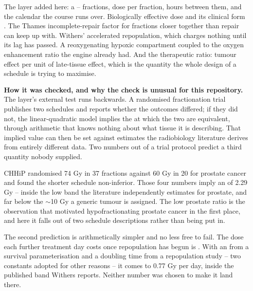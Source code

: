 \documentclass[11pt,twoside,openright]{report}
\begin{document}
\begin{numbers}
The layer added here: a  -- fractions, dose per fraction, hours between them, and the calendar the course runs over. Biologically effective dose  and its clinical form . The Thames incomplete-repair factor for fractions closer together than repair can keep up with. Withers' accelerated repopulation, which charges nothing until its lag has passed. A reoxygenating hypoxic compartment coupled to the oxygen enhancement ratio the engine already had. And the therapeutic ratio: tumour effect per unit of late-tissue effect, which is the quantity the whole design of a schedule is trying to maximise.
\end{numbers}

\textbf{How it was checked, and why the check is unusual for this repository.} The layer's external test runs backwards. A randomised fractionation trial publishes two schedules and reports whether the outcomes differed; if they did not, the linear-quadratic model implies the  at which the two are equivalent, through arithmetic that knows nothing about what tissue it is describing. That implied value can then be set against  estimates the radiobiology literature derives from entirely different data. Two numbers out of a trial protocol predict a third quantity nobody supplied.

\begin{finding}
CHHiP randomised 74 Gy in 37 fractions against 60 Gy in 20 for prostate cancer and found the shorter schedule non-inferior. Those four numbers imply an  of 2.29 Gy -- inside the low band the literature independently estimates for prostate, and far below the $\sim$10 Gy a generic tumour is assigned. The low prostate ratio is the observation that motivated hypofractionating prostate cancer in the first place, and here it falls out of two schedule descriptions rather than being put in.

The second prediction is arithmetically simpler and no less free to fail. The dose each further treatment day costs once repopulation has begun is . With an  from a survival parameterisation and a doubling time from a repopulation study -- two constants adopted for other reasons -- it comes to 0.77 Gy per day, inside the published band Withers reports. Neither number was chosen to make it land there.
\end{finding}
\end{document}
